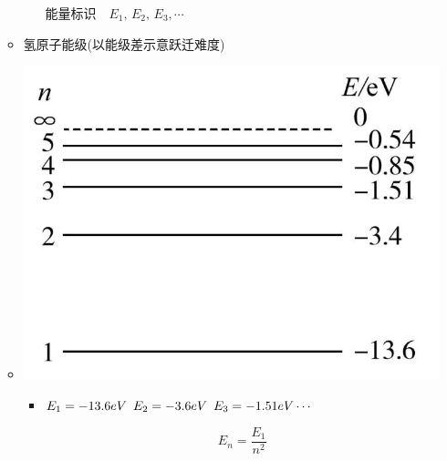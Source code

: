\documentclass{article}
\begin{document}
\begin{itemize}
\begin{itemize}
\begin{minipage}{0.52\textwidth}
\begin{itemize}
                              $\text{能量标识} \quad E_{1}, \, E_{2}, \, E_{3}, \cdots$
                      \end{itemize}
                  \end{minipage}
                  \vspace{3em}
              \item[] 氢原子能级(以能级差示意跃迁难度)
              \item[]
                  \begin{minipage}{0.4\textwidth}
                      \includegraphics[width = \textwidth]{./pictures/19.png}
                  \end{minipage}
                  \hfill\hspace{-3em}
                  \begin{minipage}{0.52\textwidth}
                      \begin{itemize}
                          \item $E_{1}=-13.6eV \hspace{0.5em} E_{2} = -3.6eV \hspace{0.5em} E_{3} = -1.51eV \cdots$

                                $$E_{n} =  \dfrac{E_{1}}{n^{2}}$$
                      \end{itemize}
                  \end{minipage}

          \end{itemize}
\end{itemize}
\end{document}
